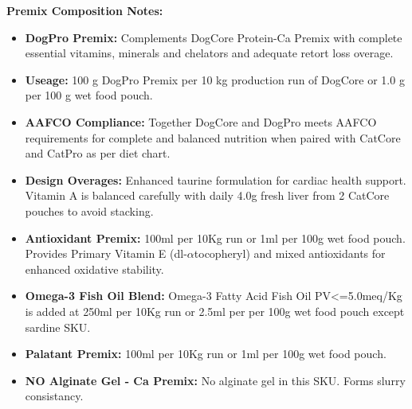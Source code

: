 \noindent\textbf{Premix Composition Notes:}
\begin{itemize}
\item \textbf{DogPro Premix: } Complements DogCore Protein-Ca Premix with complete essential vitamins, minerals and chelators and adequate retort loss overage. 
\item \textbf{Useage: }100 g  DogPro Premix per 10 kg production run of DogCore or 1.0 g per 100 g wet food pouch.
\item\textbf{AAFCO Compliance: } Together DogCore and DogPro meets AAFCO requirements for complete and balanced nutrition when paired with CatCore and CatPro as per diet chart. 
\item\textbf{Design Overages: }Enhanced taurine formulation for cardiac health support. Vitamin A is balanced carefully with daily 4.0g fresh liver from 2 CatCore pouches to avoid stacking. 
\item \textbf{Antioxidant Premix: } 100ml per 10Kg run or 1ml per 100g wet food pouch. Provides Primary Vitamin E (dl-$\alpha$tocopheryl) and mixed antioxidants for enhanced oxidative stability.
\item \textbf{Omega-3 Fish Oil Blend:} Omega-3 Fatty Acid Fish Oil PV<=5.0meq/Kg is added at 250ml per 10Kg run or 2.5ml per per 100g wet food pouch except sardine SKU.
\item \textbf{Palatant Premix: } 100ml per 10Kg run or 1ml per 100g wet food pouch.
\item \textbf{NO Alginate Gel - Ca Premix:} No alginate gel in this SKU. Forms slurry consistancy. 
\end{itemize}